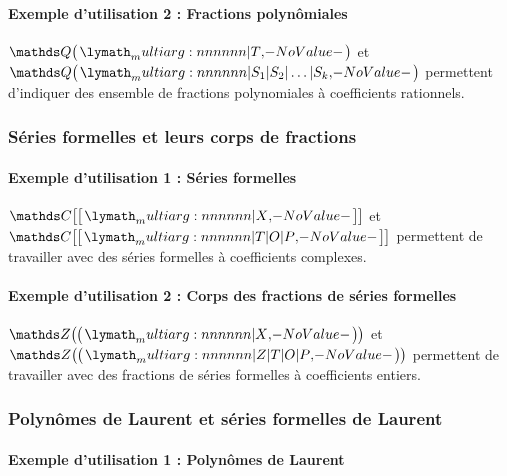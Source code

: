 \documentclass[12pt,a4paper]{article}
\theoremstyle{definition}
\begin{document}
            \paragraph{Exemple d'utilisation 2 : Fractions polynômiales}

\begin{tcblisting}{}
$\polyfracset{\QQ}{T}$ et $\polyfracset{\QQ}{S_1 | S_2 | \dots | S_k}$ permettent 
d'indiquer des ensemble de fractions polynomiales à coefficients rationnels.
\end{tcblisting}



        \subsubsection{Séries formelles et leurs corps de fractions}

            \paragraph{Exemple d'utilisation 1 : Séries formelles}

\begin{tcblisting}{}
$\serieset{\CC}{X}$ et $\serieset{\CC}{T | O | P}$ permettent de travailler avec des
séries formelles à coefficients complexes.
\end{tcblisting}



            \paragraph{Exemple d'utilisation 2 : Corps des fractions de séries formelles}

\begin{tcblisting}{}
$\seriefracset{\ZZ}{X}$ et $\seriefracset{\ZZ}{Z | T | O | P}$ permettent de travailler
avec des fractions de séries formelles à coefficients entiers.
\end{tcblisting}



        \subsubsection{Polynômes de Laurent et séries formelles de Laurent}

            \paragraph{Exemple d'utilisation 1 : Polynômes de Laurent}
\end{document}
